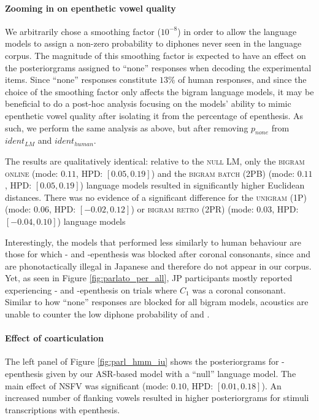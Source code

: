 \paragraph{Zooming in on epenthetic vowel quality}
We arbitrarily chose a smoothing factor ($10^{-8}$)  in order to allow the language models to assign a non-zero probability to diphones never seen in the language corpus. The magnitude of this smoothing factor is expected to have an effect on the posteriorgrams assigned to ``none'' responses when decoding the experimental items. Since ``none'' responses constitute $13\%$ of human responses, and since the choice of the smoothing factor only affects the bigram language models, it may be beneficial to do a post-hoc analysis focusing on the models' ability to mimic epenthetic vowel quality after isolating it from the percentage of epenthesis. As such, we perform the same analysis as above, but after removing $p_{none}$ from $ident_{LM}$ and $ident_{human}$.

The results are qualitatively identical: relative to the \textsc{null} LM, only the \textsc{bigram online} (mode: $0.11$, HPD: $[0.05, 0.19]$) and the \textsc{bigram batch (2PB)} (mode: $0.11$, HPD: $[0.05, 0.19]$) language models resulted in significantly higher Euclidean distances. There was no evidence of a significant difference for the \textsc{unigram (1P)} (mode: $0.06$, HPD: $[-0.02, 0.12]$) or \textsc{bigram retro (2PR)} (mode: $0.03$, HPD: $[-0.04, 0.10]$) language models 

Interestingly, the models that performed less similarly to human behaviour are those for which - and -epenthesis was blocked after coronal consonants, since  and  are phonotactically illegal in Japanese and therefore do not appear in our corpus. Yet, as seen in Figure \ref{fig:parlato_per_all}, JP participants mostly reported experiencing - and -epenthesis on trials where $C_{1}$ was a coronal consonant. Similar to how ``none'' responses are blocked for all bigram models, acoustics are unable to counter the low diphone probability of  and .

\paragraph{Effect of coarticulation}

The left panel of Figure \ref{fig:parl_hmm_iu} shows the posteriorgrams for -epenthesis given by our ASR-based model with a ``null'' language model.
The main effect of \textsc{NSFV} was significant (mode: $0.10$, HPD: $[0.01, 0.18]$). An increased number of  flanking vowels resulted in higher posteriorgrams for stimuli transcriptions with  epenthesis.

